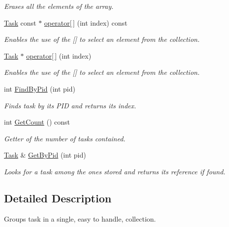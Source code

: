 \begin{DoxyCompactItemize}
\begin{DoxyCompactList}\small\item\em Erases all the elements of the array. \end{DoxyCompactList}\item 
\hyperlink{class_task}{Task} const $\ast$ \hyperlink{class_task_collection_a6d85221c73f4c7da31e2c7badb873106}{operator\mbox{[}$\,$\mbox{]}} (int index) const 
\begin{DoxyCompactList}\small\item\em Enables the use of the \mbox{[}\mbox{]} to select an element from the collection. \end{DoxyCompactList}\item 
\hyperlink{class_task}{Task} $\ast$ \hyperlink{class_task_collection_a7ad1ec5c955a5849da7346b60a3c9aa6}{operator\mbox{[}$\,$\mbox{]}} (int index)
\begin{DoxyCompactList}\small\item\em Enables the use of the \mbox{[}\mbox{]} to select an element from the collection. \end{DoxyCompactList}\item 
int \hyperlink{class_task_collection_a742b1dbb987f919bf1e504b2b7eb79c5}{Find\-By\-Pid} (int pid)
\begin{DoxyCompactList}\small\item\em Finds task by its P\-I\-D and returns its index. \end{DoxyCompactList}\item 
int \hyperlink{class_task_collection_afa17cc63d9dcf0f12c300a7c19d51905}{Get\-Count} () const 
\begin{DoxyCompactList}\small\item\em Getter of the number of tasks contained. \end{DoxyCompactList}\item 
\hyperlink{class_task}{Task} \& \hyperlink{class_task_collection_a75b63b65d83b6034f2c7f121da239a95}{Get\-By\-Pid} (int pid)
\begin{DoxyCompactList}\small\item\em Looks for a task among the ones stored and returns its reference if found. \end{DoxyCompactList}\end{DoxyCompactItemize}


\subsection{Detailed Description}
Groups task in a single, easy to handle, collection. 

